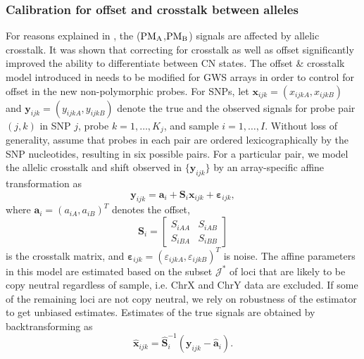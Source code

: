 \documentclass{bioinfo}
\newcommand{\GWS}{GWS\xspace}
\newcommand{\GWSFive}{GWS5\xspace}
\newcommand{\PMA}{\ensuremath{\textnormal{PM}_\textnormal{A}}\xspace}
\newcommand{\PMB}{\ensuremath{\textnormal{PM}_\textnormal{B}}\xspace}
\newcommand{\bx}{\mathbf{x}\xspace}
\newcommand{\by}{\mathbf{y}\xspace}
\newcommand{\ba}{\mathbf{a}\xspace}
\newcommand{\bS}{\mathbf{S}\xspace}
\newcommand{\beps}{\bm{\varepsilon}\xspace}
\begin{document}
\subsubsection{Calibration for offset and crosstalk between alleles}
\label{secModelACC}
For reasons explained in \citet{BengtssonH_etal_2008}, the (\PMA,\PMB) signals are affected by allelic crosstalk.  It was shown that correcting for crosstalk as well as offset significantly improved the ability to differentiate between CN states.
The offset \& crosstalk model introduced in \citet{BengtssonH_etal_2008} needs to be modified for \GWS arrays in order to control for offset in the new non-polymorphic probes.  
For SNPs, let $\bx_{ijk} = (x_{ijkA}, x_{ijkB})$ and $\by_{ijk} = (y_{ijkA}, y_{ijkB})$ denote the true and the observed signals for probe pair $(j,k)$ in SNP $j$, probe $k=1,\ldots,K_j$, and sample $i=1,\ldots,I$.  
Without loss of generality, assume that probes in each pair are ordered lexicographically by the SNP nucleotides, resulting in six possible pairs.  For a particular pair, we model the allelic crosstalk and shift observed in $\{\by_{ijk}\}$ by an array-specific affine transformation as
\begin{equation}
  \by_{ijk} = \ba_i + \bS_i \bx_{ijk} + \beps_{ijk},
  \label{eqnACCi}
\end{equation}
where $\ba_i = (a_{iA}, a_{iB})^T$ denotes the offset, 
\begin{equation}
 \bS_i = 
 \begin{bmatrix}
   S_{iAA} & S_{iAB} \\
   S_{iBA} & S_{iBB}
 \end{bmatrix}
  \label{eqnACCii}
\end{equation}
is the crosstalk matrix, and $\beps_{ijk} = (\varepsilon_{ijkA}, \varepsilon_{ijkB})^T$ is noise.  The affine parameters in this model are estimated based on the subset $\mathcal{J^*}$ of loci that are likely to be copy neutral regardless of sample, i.e. ChrX and ChrY data are excluded.  If some of the remaining loci are not copy neutral, we rely on robustness of the estimator to get unbiased estimates.
Estimates of the true signals
are obtained by backtransforming as
\begin{equation}
  \hat{\bx}_{ijk} = \hat{\bS}^{-1}_i (\by_{ijk} - \hat{\ba}_i).
  \label{eqnACCiii}
\end{equation}
\end{document}

